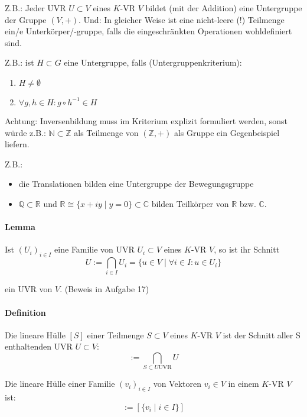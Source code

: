 	Z.B.: Jeder UVR $U\subset V$ eines $K$-VR $V$ bildet (mit der Addition) eine Untergruppe der Gruppe $(V,+)$.
    Und: In gleicher Weise ist eine nicht-leere (!) Teilmenge ein/e Unterkörper/-gruppe, falls die eingeschränkten Operationen wohldefiniert sind.
    
    Z.B.: ist $H\subset G$ eine Untergruppe, falls (Untergruppenkriterium):
    \begin{enumerate}
        \item $H\neq \emptyset$
        \item $\forall g,h\in H: g\circ h^{-1} \in H$
    \end{enumerate}
            
	Achtung: Inversenbildung muss im Kriterium explizit formuliert werden, sonst würde z.B.: $\mathbb{N}\subset\mathbb{Z}$ als Teilmenge von $(\mathbb{Z}, +)$ als Gruppe ein Gegenbeispiel liefern.
            
     Z.B.: 
     \begin{itemize}
        \item die Translationen bilden eine Untergruppe der Bewegungsgruppe
        \item $\mathbb{Q}\subset\mathbb{R}$ und $\mathbb{R}\cong \{x+iy\mid y=0\}\subset\mathbb{C}$ bilden Teilkörper von $\mathbb{R}$ bzw. $\mathbb{C}$.
     \end{itemize}

\paragraph{Lemma}
    Ist $(U_i)_{i\in I}$ eine Familie von UVR $U_i\subset V$ eines $K$-VR $V$, so ist ihr Schnitt
    \begin{equation*}
        U:= \bigcap_{i\in I}U_i =\{ u\in V\mid \forall i\in I: u\in U_i\}
    \end{equation*}
        
    ein UVR von $V$. (Beweis in Aufgabe 17)
    
\paragraph{Definition}
	Die lineare Hülle $[S]$ einer Teilmenge $S\subset V$ eines $ K $-VR $ V $ ist der Schnitt aller S enthaltenden UVR $U\subset V$:
	\begin{equation*}
		[S] := \bigcap_{S\subset U \text{UVR}} U
	\end{equation*}

	Die lineare Hülle einer Familie $(v_i)_{i\in I}$ von Vektoren $v_i\in V$ in einem $ K $-VR $ V $ ist:
        \begin{equation*}
        	[(v_i)_{i\in I}] := [\{v_i\mid i\in I\}]
        \end{equation*}

